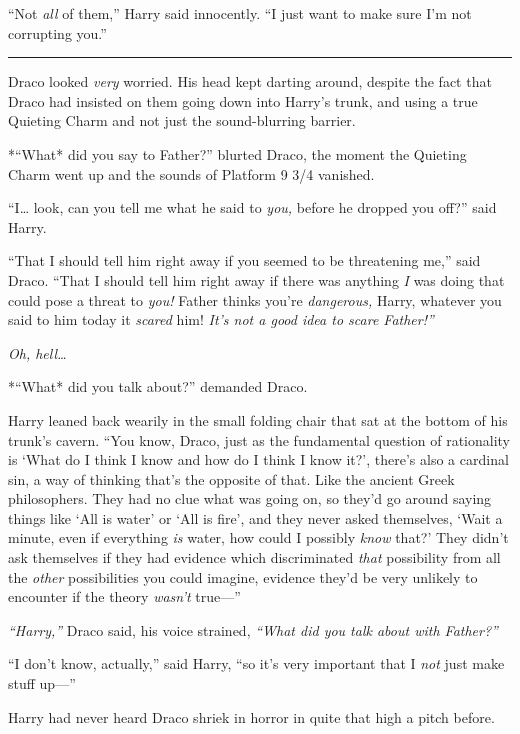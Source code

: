 ``Not \emph{all} of them,'' Harry said innocently. ``I just want to make
sure I'm not corrupting you.''

\begin{center}\rule{3in}{0.4pt}\end{center}

Draco looked \emph{very} worried. His head kept darting around, despite
the fact that Draco had insisted on them going down into Harry's trunk,
and using a true Quieting Charm and not just the sound-blurring barrier.

*``What* did you say to Father?'' blurted Draco, the moment the Quieting
Charm went up and the sounds of Platform 9 3/4 vanished.

``I\ldots{} look, can you tell me what he said to \emph{you,} before he
dropped you off?'' said Harry.

``That I should tell him right away if you seemed to be threatening
me,'' said Draco. ``That I should tell him right away if there was
anything \emph{I} was doing that could pose a threat to \emph{you!}
Father thinks you're \emph{dangerous,} Harry, whatever you said to him
today it \emph{scared} him! \emph{It's not a good idea to scare
Father!''}

\emph{Oh, hell\ldots{}}

*``What* did you talk about?'' demanded Draco.

Harry leaned back wearily in the small folding chair that sat at the
bottom of his trunk's cavern. ``You know, Draco, just as the fundamental
question of rationality is `What do I think I know and how do I think I
know it?', there's also a cardinal sin, a way of thinking that's the
opposite of that. Like the ancient Greek philosophers. They had no clue
what was going on, so they'd go around saying things like `All is water'
or `All is fire', and they never asked themselves, `Wait a minute, even
if everything \emph{is} water, how could I possibly \emph{know} that?'
They didn't ask themselves if they had evidence which discriminated
\emph{that} possibility from all the \emph{other} possibilities you
could imagine, evidence they'd be very unlikely to encounter if the
theory \emph{wasn't} true---''

\emph{``Harry,''} Draco said, his voice strained, \emph{``What did you
talk about with Father?''}

``I don't know, actually,'' said Harry, ``so it's very important that I
\emph{not} just make stuff up---''

Harry had never heard Draco shriek in horror in quite that high a pitch
before.
